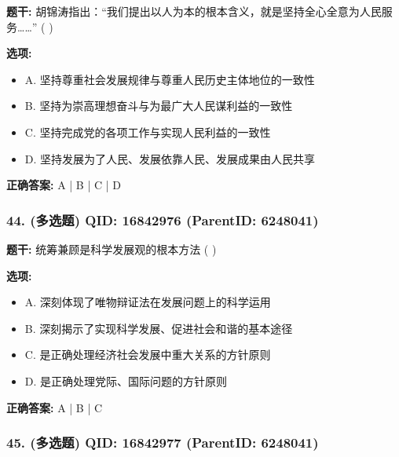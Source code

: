 \documentclass[12pt,UTF8]{ctexart}
\begin{document}
\textbf{题干:}
胡锦涛指出：“我们提出以人为本的根本含义，就是坚持全心全意为人民服务……” ( )



\textbf{选项:}
\begin{itemize}[leftmargin=*]

  \item A. 坚持尊重社会发展规律与尊重人民历史主体地位的一致性

  \item B. 坚持为崇高理想奋斗与为最广大人民谋利益的一致性

  \item C. 坚持完成党的各项工作与实现人民利益的一致性

  \item D. 坚持发展为了人民、发展依靠人民、发展成果由人民共享

\end{itemize}

\textbf{正确答案:}
A | B | C | D

\vspace{0.3em}\hrulefill\vspace{0.7em}

\subsubsection*{44. (多选题) \small QID: 16842976 (ParentID: 6248041)}

\textbf{题干:}
统筹兼顾是科学发展观的根本方法 ( )



\textbf{选项:}
\begin{itemize}[leftmargin=*]

  \item A. 深刻体现了唯物辩证法在发展问题上的科学运用

  \item B. 深刻揭示了实现科学发展、促进社会和谐的基本途径

  \item C. 是正确处理经济社会发展中重大关系的方针原则

  \item D. 是正确处理党际、国际问题的方针原则

\end{itemize}

\textbf{正确答案:}
A | B | C

\vspace{0.3em}\hrulefill\vspace{0.7em}

\subsubsection*{45. (多选题) \small QID: 16842977 (ParentID: 6248041)}
\end{document}

